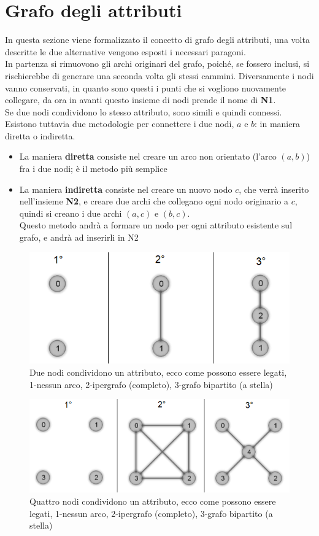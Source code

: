 \section{Grafo degli attributi}
In questa sezione viene formalizzato il concetto di grafo degli attributi, una volta descritte le due alternative vengono esposti i necessari paragoni.\\
In partenza si rimuovono gli archi originari del grafo, poiché, se fossero inclusi, si rischierebbe di generare una seconda volta gli stessi cammini. Diversamente i nodi vanno conservati, in quanto sono questi i punti che si vogliono nuovamente collegare, da ora in avanti questo insieme di nodi prende il nome di \textbf{N1}.\\
Se due nodi condividono lo stesso attributo, sono simili e quindi connessi. Esistono tuttavia due metodologie per connettere i due nodi, $a$ e $b$: in maniera diretta o indiretta.
\begin{itemize}
	\item La maniera \textbf{diretta} consiste nel creare un arco non orientato (l'arco $(a, b)$) fra i due nodi; è il metodo più semplice
	\item La maniera \textbf{indiretta} consiste nel creare un nuovo nodo $c$, che verrà inserito nell'insieme \textbf{N2}, e creare due archi che collegano ogni nodo originario a $c$, quindi si creano i due archi $(a, c)$ e $(b, c)$.\\
	Questo metodo andrà a formare un nodo per ogni attributo esistente sul grafo, e andrà ad inserirli in N2
\end{itemize}
%
\begin{figure}[htp]
	\centering
	\includegraphics{immagini/add_att2}
	\caption{Due nodi condividono un attributo, ecco come possono essere legati, 1-nessun arco, 2-ipergrafo (completo), 3-grafo bipartito (a stella)}
	\label{fig:add_att2}
\end{figure}
\begin{figure}[htp]
	\centering
	\includegraphics[width=\linewidth]{immagini/add_att4}
	\caption{Quattro nodi condividono un attributo, ecco come possono essere legati, 1-nessun arco, 2-ipergrafo (completo), 3-grafo bipartito (a stella)}
	\label{fig:add_att4}
\end{figure}
